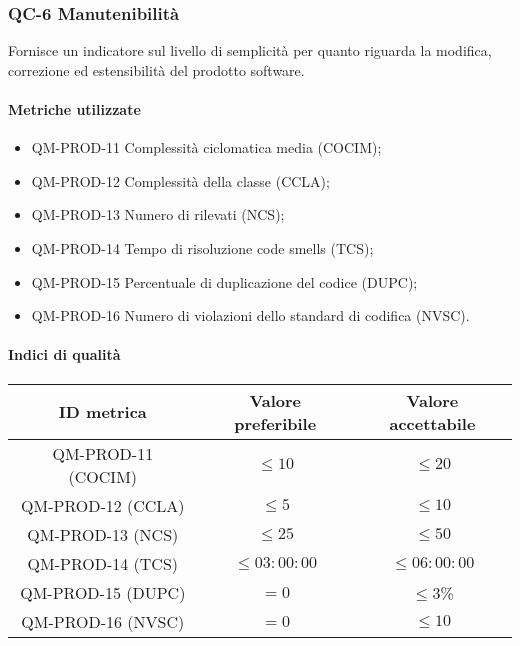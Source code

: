 \subsubsection{QC-6 Manutenibilità}
Fornisce un indicatore sul livello di semplicità per quanto riguarda la modifica, correzione ed estensibilità del prodotto software.

	\paragraph{Metriche utilizzate}
	\begin{itemize}
		\item QM-PROD-11 Complessità ciclomatica media (COCIM);
		\item QM-PROD-12 Complessità della classe (CCLA);
		\item QM-PROD-13 Numero di  rilevati (NCS);
		\item QM-PROD-14 Tempo di risoluzione code smells (TCS);
		\item QM-PROD-15 Percentuale di duplicazione del codice (DUPC);
		\item QM-PROD-16 Numero di violazioni dello standard di codifica (NVSC).
	\end{itemize}

	\paragraph{Indici di qualità}
	\begin{center}
		\begin{tabular}{|c|c|c|}
			\rowcolor{lighter-grayer}
			\hline
			\textbf{ID metrica} & \textbf{Valore preferibile} & \textbf{Valore accettabile} \\
			\hline
			QM-PROD-11 (COCIM) & \(\le 10\) & \(\le 20\) \\
			\hline
			QM-PROD-12 (CCLA) & \(\le 5\) & \(\le 10\) \\
			\hline
			QM-PROD-13 (NCS) & \(\le 25\) & \(\le 50\) \\
			\hline
			QM-PROD-14 (TCS) & \(\le 03:00:00\) & \(\le 06:00:00\) \\
			\hline
			QM-PROD-15 (DUPC) & \(= 0\) & \(\le 3\)\% \\
			\hline
			QM-PROD-16 (NVSC) & \(= 0\) & \(\le 10\) \\
			\hline
		\end{tabular}
	\end{center}
